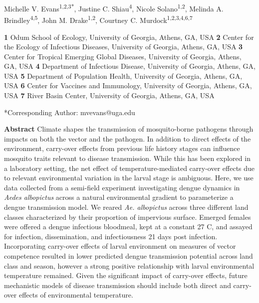 \documentclass[12pt]{article}
\begin{document}
\setlength\parindent{0pt}%

{\Large
\textbf{}}

\bigskip

Michelle V. Evans\textsuperscript{1,2,3*},
Justine C. Shiau\textsuperscript{4},
Nicole Solano\textsuperscript{1,2},
Melinda A. Brindley\textsuperscript{4,5},
John M. Drake\textsuperscript{1,2},
Courtney C. Murdock\textsuperscript{1,2,3,4,6,7}
\smallskip


\textbf{1} Odum School of Ecology, University of Georgia, Athens, GA, USA
\newline
\textbf{2} Center for the Ecology of Infectious Diseases, University of Georgia, Athens, GA, USA
\newline
\textbf{3} Center for Tropical Emerging Global Diseases, University of Georgia, Athens, GA, USA
\newline
\textbf{4} Department of Infectious Disease, University of Georgia, Athens, GA, USA
\newline
\textbf{5} Department of Population Health, University of Georgia, Athens, GA, USA
\newline
\textbf{6} Center for Vaccines and Immunology, University of Georgia, Athens, GA, USA
\newline
\textbf{7} River Basin Center, University of Georgia, Athens, GA, USA
\smallskip

\noindent
*Corresponding Author: mvevans@uga.edu
\bigskip

\newpage

\textbf{Abstract} Climate shapes the transmission of mosquito-borne pathogens through impacts on both the vector and the pathogen.  In addition to direct effects of the environment, carry-over effects from previous life history stages can influence mosquito traits relevant to disease transmission. While this has been explored in a laboratory setting, the net effect of temperature-mediated carry-over effects due to relevant environmental variation in the larval stage is ambiguous. Here, we use data collected from a semi-field experiment investigating dengue dynamics in \textit{Aedes albopictus} across a natural environmental gradient to parameterize a dengue transmission model. We reared \textit{Ae. albopictus} across three different land classes characterized by their proportion of impervious surface. Emerged females were offered a dengue infectious bloodmeal, kept at a constant 27 \degree C, and assayed for infection, dissemination, and infectiousness 21 days post infection. Incorporating carry-over effects of larval environment on measures of vector competence resulted in lower predicted dengue transmission potential across land class and season, however a strong positive relationship with larval environmental temperature remained. Given the significant impact of carry-over effects, future mechanistic models of disease transmission should include both direct and carry-over effects of environmental temperature.
\end{document}
